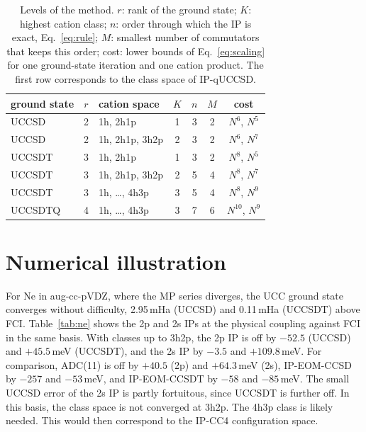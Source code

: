 \documentclass[aip,jcp,reprint,noshowkeys,superscriptaddress]{revtex4-2}
\begin{document}
\begin{table}[htb]
\caption{Levels of the method. $r$: rank of the ground state; $K$: highest cation class; $n$: order through which the IP is exact, Eq.~\eqref{eq:rule}; $M$: smallest number of commutators that keeps this order; cost: lower bounds of Eq.~\eqref{eq:scaling} for one ground-state iteration and one cation product. The first row corresponds to the class space of IP-qUCCSD.\cite{Zhang_2026}}
\label{tab:levels}
\begin{ruledtabular}
\begin{tabular}{lclcccc}
ground state & $r$ & cation space & $K$ & $n$ & $M$ & cost \\
\hline
UCCSD    & 2 & 1h, 2h1p             & 1 & 3 & 2 & $N^{6}$, $N^{5}$ \\
UCCSD    & 2 & 1h, 2h1p, 3h2p       & 2 & 3 & 2 & $N^{6}$, $N^{7}$ \\
UCCSDT   & 3 & 1h, 2h1p             & 1 & 3 & 2 & $N^{8}$, $N^{5}$ \\
UCCSDT   & 3 & 1h, 2h1p, 3h2p       & 2 & 5 & 4 & $N^{8}$, $N^{7}$ \\
UCCSDT   & 3 & 1h, \dots, 4h3p      & 3 & 5 & 4 & $N^{8}$, $N^{9}$ \\
UCCSDTQ  & 4 & 1h, \dots, 4h3p      & 3 & 7 & 6 & $N^{10}$, $N^{9}$ \\
\end{tabular}
\end{ruledtabular}
\end{table}

\section{Numerical illustration}

For Ne in aug-cc-pVDZ, where the MP series diverges, the UCC ground state converges without difficulty, 2.95\,mHa (UCCSD) and 0.11\,mHa (UCCSDT) above FCI.
Table~\ref{tab:ne} shows the 2p and 2s IPs at the physical coupling against FCI in the same basis.
With classes up to 3h2p, the 2p IP is off by $-52.5$ (UCCSD) and $+45.5$\,meV (UCCSDT), and the 2s IP by $-3.5$ and $+109.8$\,meV.
For comparison, ADC(11) is off by $+40.5$ (2p) and $+64.3$\,meV (2s), IP-EOM-CCSD by $-257$ and $-53$\,meV, and IP-EOM-CCSDT by $-58$ and $-85$\,meV.
The small UCCSD error of the 2s IP is partly fortuitous, since UCCSDT is further off.
In this basis, the class space is not converged at 3h2p. The 4h3p class is likely needed. This would then correspond to the IP-CC4 configuration space.
\end{document}
